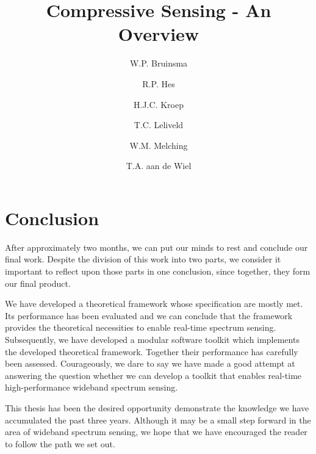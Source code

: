\documentclass[a4paper, openany, oneside]{memoir}
\title{Compressive Sensing - An Overview}
\author{W.P. Bruinsma \and R.P. Hes \and H.J.C. Kroep \and T.C. Leliveld \and W.M. Melching \and T.A. aan de Wiel}
\begin{document}
\chapter{Conclusion}
After approximately two months, we can put our minds to rest and conclude our final work. Despite the division of this work into two parts, we consider it important to reflect upon those parts in one conclusion, since together, they form our final product. 

We have developed a theoretical framework whose specification are mostly met. Its performance has been evaluated and we can conclude that the framework provides the theoretical necessities to enable real-time spectrum sensing. Subsequently, we have developed a modular software toolkit which implements the developed theoretical framework. Together their performance has carefully been assessed. Courageously, we dare to say we have made a good attempt at answering the question whether we can develop a toolkit that enables real-time high-performance wideband spectrum sensing.

This thesis has been the desired opportunity demonstrate the knowledge we have accumulated the past three years. Although it may be a small step forward in the area of wideband spectrum sensing, we hope that we have encouraged the reader to follow the path we set out.
\end{document}
